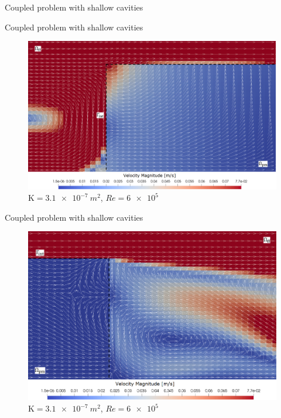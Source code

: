 \documentclass{beamer}
\begin{document}
\begin{frame}{Coupled problem with shallow cavities}
\begin{figure}
	\centering
	\hspace{-0.5cm}
	
\end{figure}
\end{frame}
\begin{frame}{Coupled problem with shallow cavities}
\begin{figure}
	\centering
	\includegraphics[height=0.8\textheight]{coupled_first_cavity_slides_labels.png}
	\caption{\tiny $\mathrm{K}=\SI{3.1e-7}{m^2}$, $Re=\num{6e5}$}
\end{figure}
\end{frame}
\begin{frame}{Coupled problem with shallow cavities}
\begin{figure}
	\centering
	\includegraphics[height=0.82\textheight]{coupled_second_cavity_slides_labels.png}
	\caption{\tiny $\mathrm{K}=\SI{3.1e-7}{m^2}$, $Re=\num{6e5}$}
\end{figure}
\end{frame}
\end{document}
